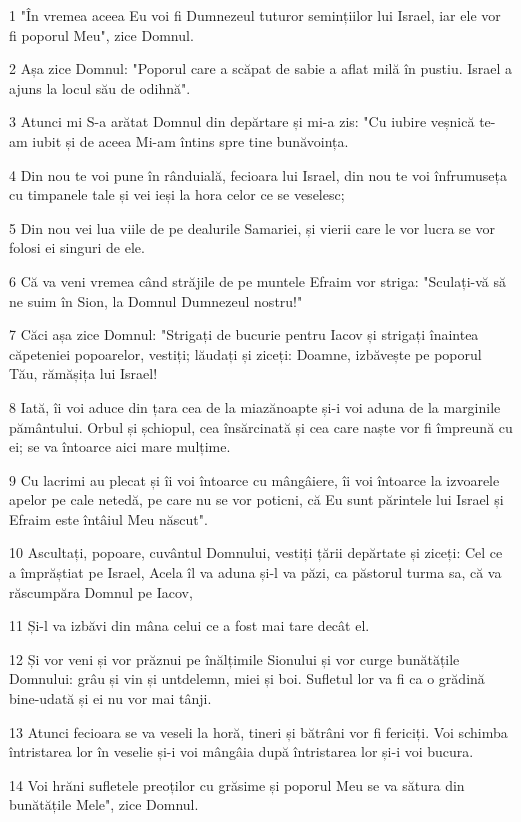 \par 1 "În vremea aceea Eu voi fi Dumnezeul tuturor semințiilor lui Israel, iar ele vor fi poporul Meu", zice Domnul.
\par 2 Așa zice Domnul: "Poporul care a scăpat de sabie a aflat milă în pustiu. Israel a ajuns la locul său de odihnă".
\par 3 Atunci mi S-a arătat Domnul din depărtare și mi-a zis: "Cu iubire veșnică te-am iubit și de aceea Mi-am întins spre tine bunăvoința.
\par 4 Din nou te voi pune în rânduială, fecioara lui Israel, din nou te voi înfrumuseța cu timpanele tale și vei ieși la hora celor ce se veselesc;
\par 5 Din nou vei lua viile de pe dealurile Samariei, și vierii care le vor lucra se vor folosi ei singuri de ele.
\par 6 Că va veni vremea când străjile de pe muntele Efraim vor striga: "Sculați-vă să ne suim în Sion, la Domnul Dumnezeul nostru!"
\par 7 Căci așa zice Domnul: "Strigați de bucurie pentru Iacov și strigați înaintea căpeteniei popoarelor, vestiți; lăudați și ziceți: Doamne, izbăvește pe poporul Tău, rămășița lui Israel!
\par 8 Iată, îi voi aduce din țara cea de la miazănoapte și-i voi aduna de la marginile pământului. Orbul și șchiopul, cea însărcinată și cea care naște vor fi împreună cu ei; se va întoarce aici mare mulțime.
\par 9 Cu lacrimi au plecat și îi voi întoarce cu mângâiere, îi voi întoarce la izvoarele apelor pe cale netedă, pe care nu se vor poticni, că Eu sunt părintele lui Israel și Efraim este întâiul Meu născut".
\par 10 Ascultați, popoare, cuvântul Domnului, vestiți țării depărtate și ziceți: Cel ce a împrăștiat pe Israel, Acela îl va aduna și-l va păzi, ca păstorul turma sa, că va răscumpăra Domnul pe Iacov,
\par 11 Și-l va izbăvi din mâna celui ce a fost mai tare decât el.
\par 12 Și vor veni și vor prăznui pe înălțimile Sionului și vor curge bunătățile Domnului: grâu și vin și untdelemn, miei și boi. Sufletul lor va fi ca o grădină bine-udată și ei nu vor mai tânji.
\par 13 Atunci fecioara se va veseli la horă, tineri și bătrâni vor fi fericiți. Voi schimba întristarea lor în veselie și-i voi mângâia după întristarea lor și-i voi bucura.
\par 14 Voi hrăni sufletele preoților cu grăsime și poporul Meu se va sătura din bunătățile Mele", zice Domnul.
